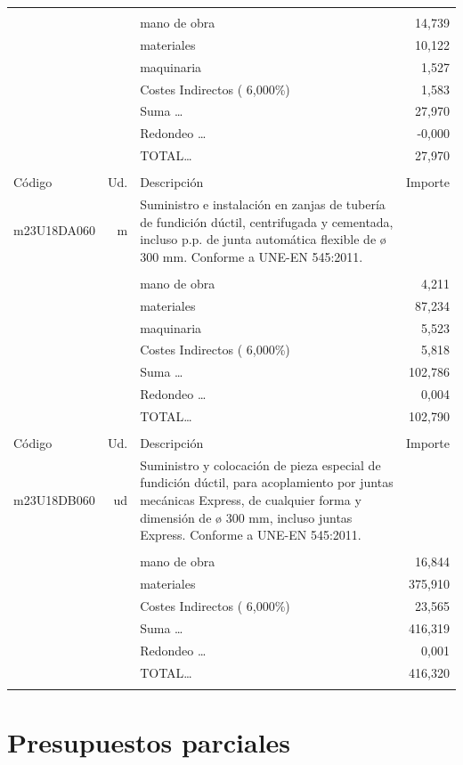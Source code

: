 \documentclass{book}%
\begin{document}
\begin{supertabular}{l r p{60mm} r}
&&&\\%
&&mano de obra&    14,739\\%
&&materiales&    10,122\\%
&&maquinaria&     1,527\\%
&&Costes Indirectos (     6,000\%)&     1,583\\%
&&Suma \ldots&    27,970\\%
&&Redondeo \ldots&    {-}0,000\\%
%
&&TOTAL\ldots&    27,970\\%
&&&\\%
Código&Ud.&Descripción&Importe\\%
\hline%
m23U18DA060&m&Suministro e instalación en zanjas de tubería de fundición dúctil, centrifugada y cementada, incluso p.p. de junta automática flexible de ø 300 mm. Conforme a UNE{-}EN 545:2011.&\\%
&&&\\%
&&mano de obra&     4,211\\%
&&materiales&    87,234\\%
&&maquinaria&     5,523\\%
&&Costes Indirectos (     6,000\%)&     5,818\\%
&&Suma \ldots&   102,786\\%
&&Redondeo \ldots&     0,004\\%
%
&&TOTAL\ldots&   102,790\\%
&&&\\%
Código&Ud.&Descripción&Importe\\%
\hline%
m23U18DB060&ud&Suministro y colocación de pieza especial de fundición dúctil, para acoplamiento por juntas mecánicas Express, de cualquier forma y dimensión de ø 300 mm, incluso juntas Express. Conforme a UNE{-}EN 545:2011.&\\%
&&&\\%
&&mano de obra&    16,844\\%
&&materiales&   375,910\\%
&&Costes Indirectos (     6,000\%)&    23,565\\%
&&Suma \ldots&   416,319\\%
&&Redondeo \ldots&     0,001\\%
%
&&TOTAL\ldots&   416,320\\%
&&&\\%
\end{supertabular}%
\normalsize%


%
\part{Presupuestos parciales}%
\end{document}
